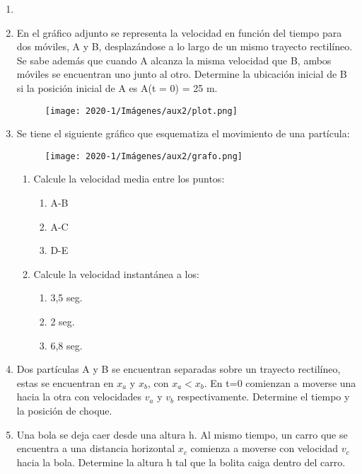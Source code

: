 \documentclass[letterpaper,11pt]{article}
\begin{document}
\vspace{-1cm}
\begin{enumerate}\setlength{\itemsep}{0.4cm}

\\
\\
\item[]
\item En el gráfico adjunto se representa la velocidad en función del tiempo para dos móviles, A y B, desplazándose a lo largo de un mismo trayecto rectilíneo. Se sabe además que cuando A alcanza la misma velocidad que B, ambos móviles se encuentran uno junto al otro. Determine la ubicación inicial de B si la posición inicial de A es A(t = 0) = 25 m.
    \begin{figure}[h!]
        \centering
        \texttt{[image: 2020-1/Imágenes/aux2/plot.png]}
    \end{figure}
\item Se tiene el siguiente gráfico que esquematiza el movimiento de una partícula:
    \begin{figure}[h!]
        \centering
        \texttt{[image: 2020-1/Imágenes/aux2/grafo.png]}
    \end{figure}

\begin{enumerate}
    \item Calcule la velocidad media entre los puntos:
        \begin{enumerate}
            \item A-B
            \item A-C
            \item D-E
        \end{enumerate}
    \item Calcule la velocidad instantánea a los:
        \begin{enumerate}
            \item 3,5 seg.
            \item 2 seg.
            \item 6,8 seg.
        \end{enumerate}
\end{enumerate}
 \item Dos partículas A y B se encuentran separadas sobre un trayecto rectilíneo, estas se encuentran en $x_a$ y $x_b$, con $x_a<x_b$. En t=0 comienzan a moverse una hacia la otra con velocidades $v_a$ y $v_b$ respectivamente. Determine el tiempo y la posición de choque. 

\item Una bola se deja caer desde una altura h. Al mismo tiempo, un carro que se encuentra a una distancia horizontal $x_c$ comienza a moverse con velocidad $v_c$ hacia la bola. 
Determine la altura h tal que la bolita caiga dentro del carro. 

\end{enumerate}
\end{document}
